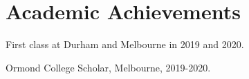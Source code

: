 \documentclass[a4]{article}
\renewenvironment{itemize}{
  \begin{list}{}{
    \setlength{\leftmargin}{1.5em}
  }
}{
  \end{list}
}
\begin{document}
\section*{Academic Achievements}
\begin{itemize}
	\item First class at Durham and Melbourne in 2019 and 2020.
	\item Ormond College Scholar, Melbourne, 2019-2020.
\end{itemize}



\end{document}
